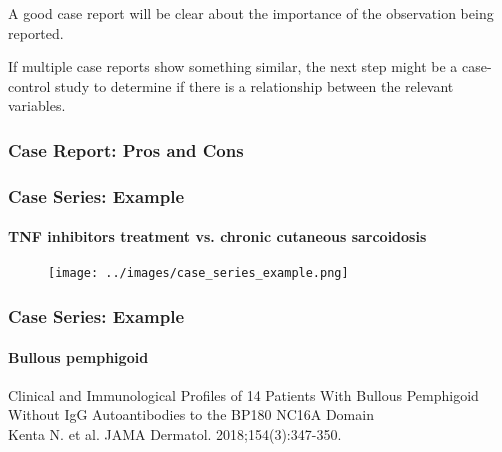 \documentclass[table,10pt]{beamer}
\begin{document}
\begin{CJK*}{UTF8}{gbsn}
\begin{frame}[t]
A good case report will be clear about the importance of the observation being reported.

If multiple case reports show something similar, the next step might be a case-control 
study to determine if there is a relationship between the relevant variables.
\end{frame}


\begin{frame}[t]
\frametitle{Case Report: Pros and Cons}
\end{frame}

\begin{frame}[t]
\frametitle{Case Series: Example}
\framesubtitle{TNF inhibitors treatment vs. chronic cutaneous sarcoidosis}
\begin{figure}
\texttt{[image: ../images/case\_series\_example.png]}
\end{figure}
\end{frame}

\begin{frame}[t]
\frametitle{Case Series: Example}
\framesubtitle{Bullous pemphigoid}
{\large \alert{Clinical and Immunological Profiles of 14 Patients With Bullous
Pemphigoid Without IgG Autoantibodies to the BP180 NC16A Domain}}\\
\small{Kenta N. et al. JAMA Dermatol. 2018;154(3):347-350.}


\end{frame}
\end{CJK*}
\end{document}
